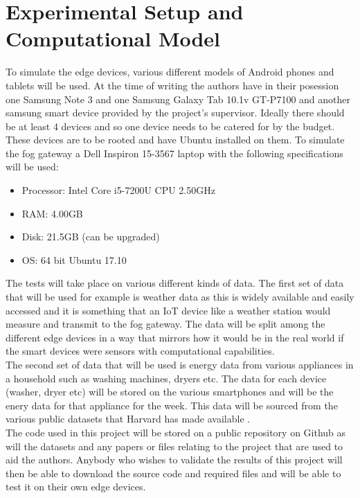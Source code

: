 \documentclass[11pt,journal, a4paper]{IEEEtran}
\begin{document}
\section{Experimental Setup and Computational Model}
\noindent
To simulate the edge devices, various different models of Android phones and tablets will be used. At the time of writing the authors have in their posession one Samsung Note 3 and one Samsung Galaxy Tab 10.1v GT-P7100 and another samsung smart device provided by the project's supervisor. Ideally there should be at least 4 devices and so one device needs to be catered for by the budget. These devices are to be rooted and have Ubuntu installed on them. To simulate the fog gateway a Dell Inspiron 15-3567 laptop with the following specifications will be used:

\begin{itemize}
\item Processor: Intel Core i5-7200U CPU 2.50GHz
\item RAM: 4.00GB
\item Disk: 21.5GB (can be upgraded)
\item OS: 64 bit Ubuntu 17.10
\end{itemize}


\noindent
The tests will take place on various different kinds of data. The first set of data that will be used for example is weather data as this is widely available and easily accessed and it is something that an IoT device like a weather station would measure and transmit to the fog gateway. The data will be split among the different edge devices in a way that mirrors how it would be in the real world if the smart devices were sensors with computational capabilities.\\

\noindent
The second set of data that will be used is energy data from various appliances in a household such as washing machines, dryers etc. The data for each device (washer, dryer etc) will be stored on the various smartphones and will be the enery data for that appliance for the week. This data will be sourced from the various public datasets that Harvard has made available \cite{Harv}. \\

\noindent
The code used in this project will be stored on a public repository on Github as will the datasets and any papers or files relating to the project that are used to aid the authors. Anybody who wishes to validate the results of this project will then be able to download the source code and required files and will be able to test it on their own edge devices. 
\end{document}
